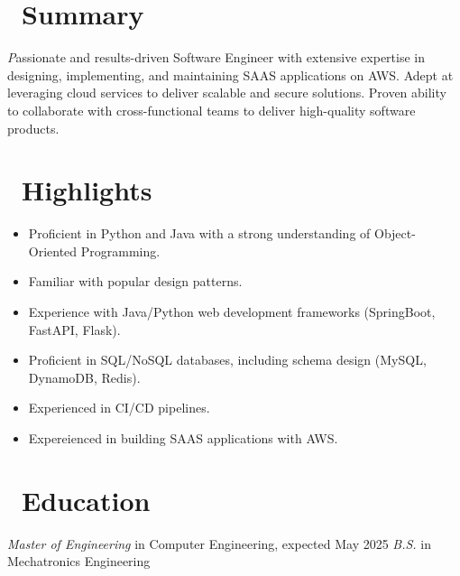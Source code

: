 \documentclass{resume}
\begin{document}



\section{\faChild\ Summary}
\textit Passionate and results-driven Software Engineer with extensive expertise in designing, implementing, and maintaining SAAS applications on AWS. Adept at leveraging cloud services to deliver scalable and secure solutions. Proven ability to collaborate with cross-functional teams to deliver high-quality software products.

\section{\faKey\ Highlights}
\begin{itemize}[parsep=0.5ex]
  \item Proficient in Python and Java with a strong understanding of Object-Oriented Programming.
  \item Familiar with popular design patterns.
  \item Experience with Java/Python web development frameworks (SpringBoot, FastAPI, Flask).
  \item Proficient in SQL/NoSQL databases, including schema design (MySQL, DynamoDB, Redis).
  \item Experienced in CI/CD pipelines.
  \item Expereienced in building SAAS applications with AWS.
\end{itemize}

\section{\faGraduationCap\ Education}
\textit{Master of Engineering} in Computer Engineering, expected May 2025
\textit{B.S.} in Mechatronics Engineering
\end{document}
